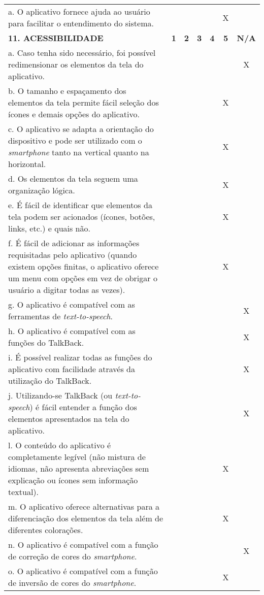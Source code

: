 \documentclass[portuguese,oneside]{tcc}
\begin{document}
\begin{center}
\begin{longtabu}{|L{25em}|c|c|c|c|c|c|}
																	a. O aplicativo fornece ajuda ao usuário para facilitar o entendimento do sistema. & & & & & X & \\ 
																	\textbf{11. ACESSIBILIDADE} & \textbf{1} & \textbf{2} & \textbf{3} & \textbf{4} & \textbf{5} & \textbf{N/A} \\ 
																	a. Caso tenha sido necessário, foi possível redimensionar os elementos da tela do aplicativo. & & & & & & X \\ 
																	b. O tamanho e espaçamento dos elementos da tela permite fácil seleção dos ícones e demais opções do aplicativo. & & & & & X & \\ 
																	c. O aplicativo se adapta a orientação do dispositivo e pode ser utilizado com o \emph{smartphone} tanto na vertical quanto na horizontal. & & & & & X & \\ 
																	d. Os elementos da tela seguem uma organização lógica. & & & & & X & \\ 
																	e. É fácil de identificar que elementos da tela podem ser acionados (ícones, botões, links, etc.) e quais não. & & & & & X & \\ 
																	f. É fácil de adicionar as informações requisitadas pelo aplicativo (quando existem opções finitas, o aplicativo oferece um menu com opções em vez de obrigar o usuário a digitar todas as vezes). & & & & & X & \\ 
																	g. O aplicativo é compatível com as ferramentas de \emph{text-to-speech}. & & & & & & X \\ 
																	h. O aplicativo é compatível com as funções do TalkBack. & & & & & & X \\ 
																	i. É possível realizar todas as funções do aplicativo com facilidade através da utilização do TalkBack.	& & & & & & X \\ 
																	j. Utilizando-se TalkBack (ou \emph{text-to-speech}) é fácil entender a função dos elementos apresentados na tela do aplicativo. & & & & & & X \\ 
																	l. O conteúdo do aplicativo é completamente legível (não mistura de idiomas, não apresenta abreviações sem explicação ou ícones sem informação textual). & & & & & X & \\ 
																	m. O aplicativo oferece alternativas para a diferenciação dos elementos da tela além de diferentes colorações. & & & & & X & \\ 
																	n. O aplicativo é compatível com a função de correção de cores do \emph{smartphone}. & & & & & & X \\ 
																	o. O aplicativo é compatível com a função de inversão de cores do \emph{smartphone}. & & & & & X & \\ 
																\end{longtabu}
															\end{center}
															
\end{document}

